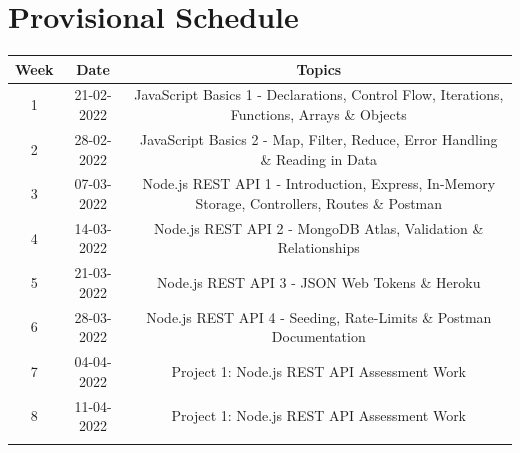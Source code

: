\documentclass{article}
\begin{document}
\section*{Provisional Schedule}

\renewcommand{\arraystretch}{1.5}
\begin{tabular}{|c|c|c|c|}
	\hline
	\textbf{Week}    & \textbf{Date}            & \multicolumn{2}{c|}{\textbf{Topics}}                                                                                             \\ \hline
	\footnotesize 1  & \footnotesize 21-02-2022 & \multicolumn{2}{c|}{\footnotesize JavaScript Basics 1 - Declarations, Control Flow, Iterations, Functions, Arrays \& Objects}    \\ \hline
	\footnotesize 2  & \footnotesize 28-02-2022 & \multicolumn{2}{c|}{\footnotesize JavaScript Basics 2 - Map, Filter, Reduce, Error Handling \& Reading in Data}                  \\ \hline
	\footnotesize 3  & \footnotesize 07-03-2022 & \multicolumn{2}{c|}{\footnotesize Node.js REST API 1 - Introduction, Express, In-Memory Storage, Controllers, Routes \& Postman} \\ \hline
	\footnotesize 4  & \footnotesize 14-03-2022 & \multicolumn{2}{c|}{\footnotesize Node.js REST API 2 - MongoDB Atlas, Validation \& Relationships}                               \\ \hline
	\footnotesize 5  & \footnotesize 21-03-2022 & \multicolumn{2}{c|}{\footnotesize Node.js REST API 3 - JSON Web Tokens \& Heroku}                                                \\ \hline
	\footnotesize 6  & \footnotesize 28-03-2022 & \multicolumn{2}{c|}{\footnotesize Node.js REST API 4 -  Seeding, Rate-Limits \& Postman Documentation}                           \\ \hline
	\footnotesize 7  & \footnotesize 04-04-2022 & \multicolumn{2}{c|}{\footnotesize Project 1: Node.js REST API Assessment Work}                                                   \\ \hline
	\footnotesize 8  & \footnotesize 11-04-2022 & \multicolumn{2}{c|}{\footnotesize Project 1: Node.js REST API Assessment Work}                                                   \\ \hline
	\rowcolor{yellow} \multicolumn{4}{|c|}{\footnotesize Mid Term Break}                                                                                                           \\ \hline

\end{tabular}
\end{document}
